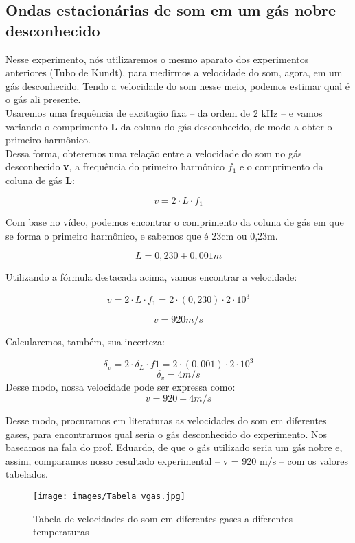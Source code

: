 \subsection{Ondas estacionárias de som em um gás nobre
desconhecido}

Nesse experimento, nós utilizaremos o mesmo aparato dos experimentos anteriores (Tubo de Kundt), para medirmos a velocidade do som, agora, em um gás desconhecido. Tendo a velocidade do som nesse meio, podemos estimar qual é o gás ali presente.\\

Usaremos uma frequência de excitação fixa – da ordem de 2 kHz – e vamos variando o comprimento \textbf{L} da coluna do gás desconhecido, de modo a obter o primeiro harmônico.\\

Dessa forma, obteremos uma relação entre a velocidade do som no gás desconhecido \textbf{v}, a frequência do primeiro harmônico \textbf{$f_1$} e o comprimento da coluna de gás \textbf{L}:

\[v = 2\cdot L\cdot f_1\]

Com base no vídeo, podemos encontrar o comprimento da coluna de gás em que se forma o primeiro harmônico, e sabemos que é 23cm ou 0,23m.

\[L = 0,230 \pm 0,001 m\]

Utilizando a fórmula destacada acima, vamos encontrar a velocidade:

\[ v = 2\cdot L \cdot f_1   =   2\cdot(0,230)\cdot 2\cdot 10^3\]

\[v = 920 m/s\]

Calcularemos, também, sua incerteza:

\[\delta _v = 2 \cdot \delta _L \cdot f1   =   2\cdot(0,001)\cdot2\cdot10^3\]
\[\delta _v = 4 m/s\]
Desse modo, nossa velocidade pode ser expressa como:
\[v = 920 \pm 4 m/s\]

Desse modo, procuramos em literaturas as velocidades do som em diferentes gases, para encontrarmos qual seria o gás desconhecido do experimento. Nos baseamos na fala do prof. Eduardo, de que o gás utilizado seria um gás nobre e, assim, comparamos nosso resultado experimental -- v = 920 m/s -- com os valores tabelados.\\


\begin{figure}[H]
  \centering
  \texttt{[image: images/Tabela vgas.jpg]}
  \caption{Tabela de velocidades do som em diferentes gases a diferentes temperaturas}
\end{figure}


